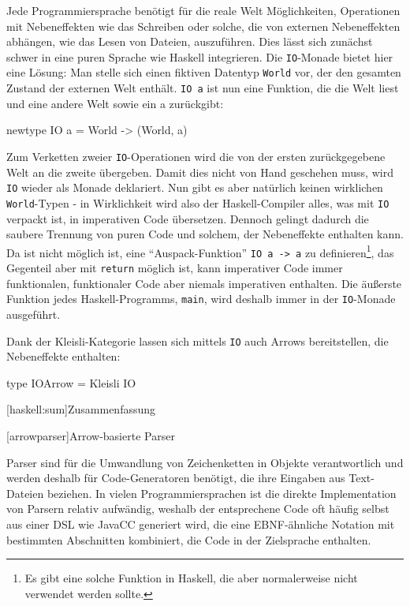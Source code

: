 \documentclass[11pt, a4paper, bibgerm]{scrbook}
\newcommand\icode[1]{\lstinline?#1?}
\newcommand\lchapter{}
\newcommand\lsection{}
\begin{document}
Jede Programmiersprache benötigt für die reale Welt Möglichkeiten,
Operationen mit Nebeneffekten wie das Schreiben oder solche, die von
externen Nebeneffekten abhängen, wie das Lesen von Dateien,
auszuführen. Dies lässt sich zunächst schwer in eine puren Sprache wie
Haskell integrieren. Die \icode{IO}-Monade bietet hier eine Lösung: Man
stelle sich einen fiktiven Datentyp \icode{World} vor, der den gesamten
Zustand der externen Welt enthält. \icode{IO a} ist nun eine Funktion,
die die Welt liest und eine andere Welt sowie ein a zurückgibt:
\begin{code}
newtype IO a = World -> (World, a)
\end{code}
Zum Verketten zweier \icode{IO}-Operationen wird die von der ersten
zurückgegebene Welt an die zweite übergeben. Damit dies nicht von Hand
geschehen muss, wird \icode{IO} wieder als Monade deklariert. Nun gibt
es aber natürlich keinen wirklichen \icode{World}-Typen - in
Wirklichkeit wird also der Haskell-Compiler alles, was mit \icode{IO}
verpackt ist, in imperativen Code übersetzen. Dennoch gelingt dadurch
die saubere Trennung von puren Code und solchem, der Nebeneffekte
enthalten kann. Da ist nicht möglich ist, eine "`Auspack-Funktion"'
\icode{IO a -> a} zu definieren\footnote{Es gibt eine solche Funktion in
  Haskell, die aber normalerweise nicht verwendet werden sollte.}, das
Gegenteil aber mit \icode{return} möglich ist, kann imperativer Code
immer funktionalen, funktionaler Code aber niemals imperativen
enthalten. Die äußerste Funktion jedes Haskell-Programms, \icode{main},
wird deshalb immer in der \icode{IO}-Monade ausgeführt.

Dank der Kleisli-Kategorie lassen sich mittels \icode{IO} auch Arrows
bereitstellen, die Nebeneffekte enthalten:
\begin{code}
type IOArrow = Kleisli IO
\end{code}

\lsection[haskell:sum]{Zusammenfassung}

\lchapter[arrowparser]{Arrow-basierte Parser}

Parser sind für die Umwandlung von Zeichenketten in Objekte
verantwortlich und werden deshalb für Code-Generatoren benötigt, die
ihre Eingaben aus Text-Dateien beziehen. In vielen Programmiersprachen
ist die direkte Implementation von Parsern relativ aufwändig, weshalb
der entsprechene Code oft häufig selbst aus einer DSL wie JavaCC
generiert wird, die eine EBNF-ähnliche Notation mit bestimmten
Abschnitten kombiniert, die Code in der Zielsprache enthalten.
\end{document}
